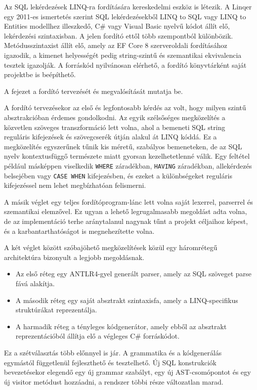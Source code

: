 Az SQL lekérdezések LINQ-ra fordítására kereskedelmi eszköz is létezik. A Linqer \cite{linqer} egy 2011-es ismertetés \cite{selmani2011linqer} szerint SQL lekérdezésekből LINQ to SQL vagy LINQ to Entities modellhez illeszkedő, C\# vagy Visual Basic nyelvű kódot állít elő, lekérdezési szintaxisban. A jelen fordító ettől több szempontból különbözik. Metódusszintaxist állít elő, amely az EF Core 8 szerveroldali fordításához igazodik, a kimenet helyességét pedig string-szintű és szemantikai ekvivalencia tesztek igazolják. A forráskód nyilvánosan elérhető, a fordító könyvtárként saját projektbe is beépíthető.

\label{chap:megvalositas}

A fejezet a fordító tervezését és megvalósítását mutatja be.


A fordító tervezésekor az első és legfontosabb kérdés az volt, hogy milyen szintű absztrakcióban érdemes gondolkodni. Az egyik szélsőséges megközelítés a közvetlen szöveges transzformáció lett volna, ahol a bemeneti SQL string reguláris kifejezések és szövegcserék útján alakul át LINQ kóddá. Ez a megközelítés egyszerűnek tűnik kis méretű, szabályos bemeneteken, de az SQL nyelv kontextusfüggő természete miatt gyorsan kezelhetetlenné válik. Egy feltétel például másképpen viselkedik \texttt{WHERE} záradékban, \texttt{HAVING} záradékban, allekérdezés belsejében vagy \texttt{CASE WHEN} kifejezésben, és ezeket a különbségeket reguláris kifejezéssel nem lehet megbízhatóan felismerni.

A másik véglet egy teljes fordítóprogram-lánc lett volna saját lexerrel, parserrel és szemantikai elemzővel. Ez ugyan a lehető legrugalmasabb megoldást adta volna, de az implementáció terhe aránytalanul nagynak tűnt a projekt céljaihoz képest, és a karbantarthatóságot is megnehezítette volna.

A két véglet között szóbajöhető megközelítések közül egy háromrétegű architektúra bizonyult a legjobb megoldásnak.
\begin{itemize}
	\item Az első réteg egy ANTLR4-gyel generált parser, amely az SQL szöveget parse fává alakítja.
	\item A második réteg egy saját absztrakt szintaxisfa, amely a LINQ-specifikus struktúrákat reprezentálja.
	\item A harmadik réteg a tényleges kódgenerátor, amely ebből az absztrakt reprezentációból állítja elő a végleges C\# forráskódot.
\end{itemize}
Ez a szétválasztás több előnnyel is jár. A grammatika és a kódgenerálás egymástól függetlenül fejleszthető és tesztelhető. Új SQL konstrukciók bevezetésekor elegendő egy új grammar szabályt, egy új AST-csomópontot és egy új visitor metódust hozzáadni, a rendszer többi része változatlan marad.

